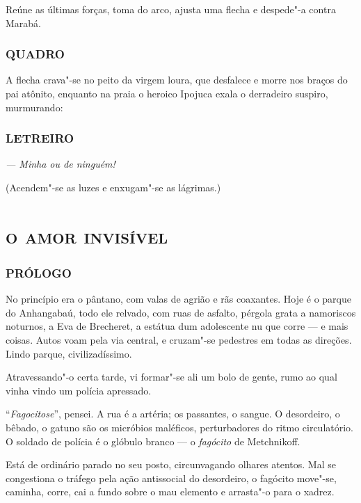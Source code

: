Reúne as últimas forças, toma do arco, ajusta uma flecha e despede"-a
contra Marabá.

\section*{QUADRO}

A flecha crava"-se no peito da virgem loura, que desfalece e morre nos
braços do pai atônito, enquanto na praia o heroico Ipojuca exala o
derradeiro suspiro, murmurando:

\section*{LETREIRO}

\emph{--- Minha ou de ninguém!}

(Acendem"-se as luzes e enxugam"-se as lágrimas.)

\part{\textsc{o amor invisível}}


\section*{PRÓLOGO}

No princípio era o pântano, com valas de agrião e rãs coaxantes. Hoje é
o parque do Anhangabaú, todo ele relvado, com ruas de asfalto, pérgola
grata a namoriscos noturnos, a Eva de Brecheret, a estátua dum
adolescente nu que corre --- e mais coisas. Autos voam pela via central,
e cruzam"-se pedestres em todas as direções. Lindo parque,
civilizadíssimo.

Atravessando"-o certa tarde, vi formar"-se ali um bolo de gente, rumo ao
qual vinha vindo um polícia apressado.

``\emph{Fagocitose}'', pensei. A rua é a artéria; os passantes, o
sangue. O desordeiro, o bêbado, o gatuno são os micróbios maléficos,
perturbadores do ritmo circulatório. O soldado de polícia é o glóbulo
branco --- o \emph{fagócito} de Metchnikoff.

Está de ordinário parado no seu posto, circunvagando olhares atentos.
Mal se congestiona o tráfego pela ação antissocial do desordeiro, o
fagócito move"-se, caminha, corre, cai a fundo sobre o mau elemento e
arrasta"-o para o xadrez.

